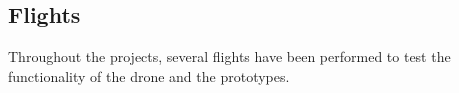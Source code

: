 \newpage
\subsection{Flights}
Throughout the projects, several flights have been performed to test the functionality of the drone and the prototypes.





